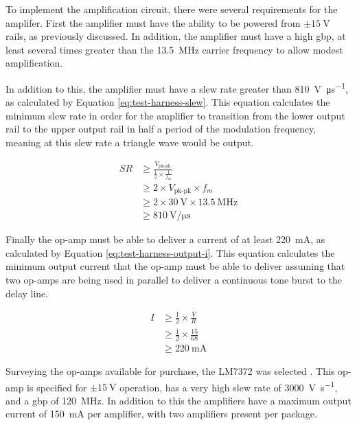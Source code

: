 To implement the amplification circuit, there were several requirements for the amplifer. First the amplifier must have the ability to be powered from  $\pm \SI{15}{\volt}$ rails, as previously discussed. In addition, the amplifier must have a high \gls{gbp}, at least several times greater than the \SI{13.5}{\mega\hertz} carrier frequency to allow modest amplification.

In addition to this, the amplifier must have a slew rate greater than \SI{810}{\volt\per\micro\second}, as calculated by Equation \ref{eq:test-harness-slew}. This equation calculates the minimum slew rate in order for the amplifier to transition from the lower output rail to the upper output rail in half a period of the modulation frequency, meaning at this slew rate a triangle wave would be output.

\begin{align}
	SR &\geq \frac{V_\text{pk-pk}}{\frac{1}{2} \times \frac{1}{f_m}}  \nonumber \\
	&\geq 2 \times V_\text{pk-pk} \times f_m  \nonumber \\
	&\geq 2 \times \SI{30}{\volt} \times \SI{13.5}{\mega\hertz}  \nonumber \\
	&\geq \SI{810}{\volt\per\micro\second} \label{eq:test-harness-slew}
\end{align}

Finally the op-amp must be able to deliver a current of at least \SI{220}{\milli\ampere}, as calculated by Equation \ref{eq:test-harness-output-i}. This equation calculates the minimum output current that the op-amp must be able to deliver assuming that two op-amps are being used in parallel to deliver a continuous tone burst to the delay line.

\begin{align}
I &\geq \frac{1}{2} \times \frac{V}{R}  \nonumber \\
&\geq \frac{1}{2} \times \frac{15}{68}  \nonumber \\
&\geq \SI{220}{\milli\ampere} \label{eq:test-harness-output-i}
\end{align}

Surveying the op-amps available for purchase, the LM7372 was selected \cite{ti2014}. This op-amp is specified for $\pm \SI{15}{\volt}$ operation, has a very high slew rate of \SI{3000}{\volt\per\second}, and a \gls{gbp} of \SI{120}{\mega\hertz}. In addition to this the amplifiers have a maximum output current of \SI{150}{\milli\ampere} per amplifier, with two amplifiers present per package.

